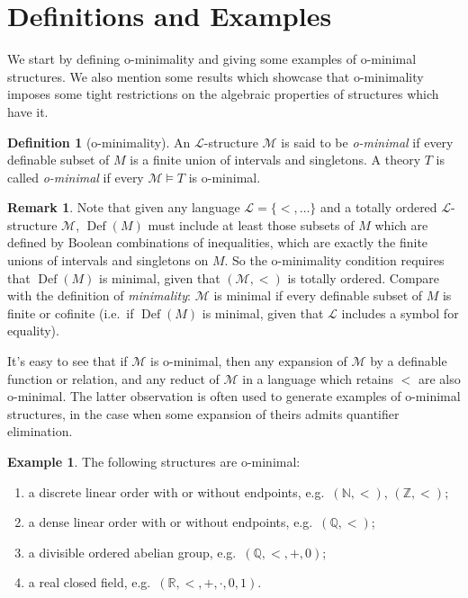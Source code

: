 \documentclass[a4paper]{report}
\newcommand{\ind}{\hspace{15pt}}
\newcommand{\R}{\mathbb{R}}
\newcommand{\Q}{\mathbb{Q}}
\newcommand{\Nat}{\mathbb{N}}
\newcommand{\Z}{\mathbb{Z}}
\renewcommand{\L}{\mathcal{L}}
\newcommand{\M}{\mathcal{M}}
\DeclareMathOperator{\Def}{Def}
\theoremstyle{definition}
\newtheorem{defn}[thm]{Definition}
\newtheorem{exmp}[thm]{Example}
\theoremstyle{remstyle}
\newtheorem{rem}[thm]{Remark}
\begin{document}
\section{Definitions and Examples}

\ind We start by defining o-minimality and giving some examples of o-minimal structures. We also mention some results which showcase that o-minimality imposes some tight restrictions on the algebraic properties of structures which have it.

\begin{defn}[o-minimality]\label{omindef}
	An $\L$-structure $\M$ is said to be \emph{o-minimal} if every definable subset of $M$ is a finite union of intervals and singletons. A theory $T$ is called \emph{o-minimal} if every $\M\models T$ is o-minimal.
\end{defn}

\begin{rem}
	Note that given any language $\L=\{<,\ldots\}$ and a totally ordered $\L$-structure $\M$, $\Def(M)$ must include at least those subsets of $M$ which are defined by Boolean combinations of inequalities, which are exactly the finite unions of intervals and singletons on $M$. So the o-minimality condition requires that $\Def(M)$ is minimal, given that $(\M,<)$ is totally ordered. Compare with the definition of \emph{minimality}: $\M$ is minimal if every definable subset of $M$ is finite or cofinite (i.e.\ if $\Def(M)$ is minimal, given that $\L$ includes a symbol for equality).
\end{rem}

\ind It's easy to see that if $\M$ is o-minimal, then any expansion of $\M$ by a definable function or relation, and any reduct of $\M$ in a language which retains $<$ are also o-minimal. The latter observation is often used to generate examples of o-minimal structures, in the case when some expansion of theirs admits quantifier elimination.

\begin{exmp}
	The following structures are o-minimal:
	\begin{enumerate}
		\item a discrete linear order with or without endpoints, e.g.\ $(\Nat,<)$, $(\Z,<)$;
		\item a dense linear order with or without endpoints, e.g.\ $(\Q,<)$;
		\item a divisible ordered abelian group, e.g.\ $(\Q,<,+,0)$;
		\item a real closed field, e.g.\ $(\R,<,+,\cdot,0,1)$.
	\end{enumerate}
\end{exmp}
\end{document}
